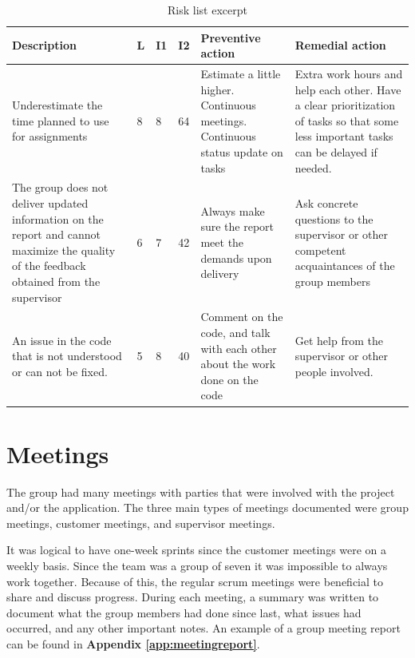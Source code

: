 \begin{table}[!h]
\begin{center}
	\caption{Risk list excerpt} 
	\label{Tab:riskexample}
	\begin{tabular}{ | p{3.5cm} | p{2cm} | p{1.5cm} | p{2cm} | p{3.5cm} | p{3.5cm}|}

		\hline
		\textbf{Description} & \textbf{L} & \textbf{I1} & \textbf{I2} & \textbf{Preventive action} & \textbf{Remedial action} \\ \hline
		
		Underestimate the time planned to use for assignments & 8 & 8 & 64 & Estimate a little higher. Continuous meetings. Continuous status update on tasks & Extra work hours and help each other. Have a clear prioritization of tasks so that some less important tasks can be delayed if needed. \\ \hline
		
		The group does not deliver updated information on the report and cannot maximize the quality of the feedback obtained from the supervisor & 6 & 7 & 42 & Always make sure the report meet the demands upon delivery & Ask concrete questions to the supervisor or other competent acquaintances of the group members \\ \hline
		
		An issue in the code that is not understood or can not be fixed. & 5 & 8 & 40 & Comment on the code, and talk with each other about the work done on the code & Get help from the supervisor or other people involved. \\ \hline
	\end{tabular}
\end{center}
\end{table}

\section{Meetings}
\label{sec:meetings}

The group had many meetings with parties that were involved with the project and/or the application. The three main types of meetings documented were group meetings, customer meetings, and supervisor meetings.\newline 

It was logical to have one-week sprints since the customer meetings were on a weekly basis. Since the team was a group of seven it was impossible to always work together. Because of this, the regular scrum meetings were beneficial to share and discuss progress. During each meeting, a summary was written to document what the group members had done since last, what issues had occurred, and any other important notes. An example of a group meeting report can be found in \textbf{Appendix \ref{app:meetingreport}}.\newline


